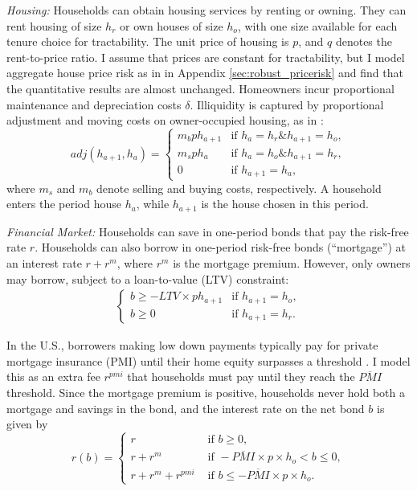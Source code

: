 \documentclass[12pt]{article}
\begin{document}
\textit{Housing:} Households can obtain housing services by renting or owning. They can rent housing of size $h_r$ or own houses of size $h_o$, with one size available for each tenure choice for tractability. The unit price of housing is $p$, and $q$ denotes the rent-to-price ratio. I assume that prices are constant for tractability, but I model aggregate house price risk as in \cite{Corbae2015} in Appendix \ref{sec:robust_pricerisk} and find that the quantitative results are almost unchanged. Homeowners incur proportional maintenance and depreciation costs $\delta$. Illiquidity is captured by proportional adjustment and moving costs on owner-occupied housing, as in \cite{Yang2009}:
\begin{equation}\label{eq:transcost}
adj(h_{a+1},h_a) = \begin{cases}
m_b p h_{a+1} & \text{if } h_{a}=h_r\mathbin{\&} h_{a+1}= h_o, \\
m_s p h_a 	& \text{if } h_a = h_o\mathbin{\&}h_{a+1}=h_r, \\
0 & \text{if } h_{a+1} = h_a,
\end{cases}
\end{equation} where $m_s$ and $m_b$ denote selling and buying costs, respectively. A household enters the period house $h_a$, while $h_{a+1}$ is the house chosen in this period. 

\textit{Financial Market:} Households can save in one-period bonds that pay the risk-free rate $r$. Households can also borrow in one-period risk-free bonds (``mortgage'') at an interest rate $r + r^m$, where $r^m$ is the mortgage premium. However, only owners may borrow, subject to a loan-to-value (LTV) constraint:
\begin{align*}
\begin{cases}
b\ge - LTV \times p h_{a+1} & \text{if } h_{a+1} = h_o, \\ 
b\ge 0 & \text{if } h_{a+1} = h_r.
\end{cases}
\end{align*}

In the U.S., borrowers making low down payments typically pay for private mortgage insurance (PMI) until their home equity surpasses a threshold \citep{goodman2017sixty}. I model this as an extra fee $r^{pmi}$ that households must pay until they reach the $\overline{PMI}$ threshold. Since the mortgage premium is positive, households never hold both a mortgage and savings in the bond, and the interest rate on the net bond $b$ is given by
\begin{equation}\label{eq:rb}
r(b) = \begin{cases}
r & \text{ if } b \ge 0, \\
r +r^m & \text{ if } -\overline{PMI}\times p\times h_o < b \le 0, \\
r +r^m +r^{pmi}& \text{ if } b \le -\overline{PMI}\times p\times h_o.
\end{cases}
\end{equation}
\end{document}
